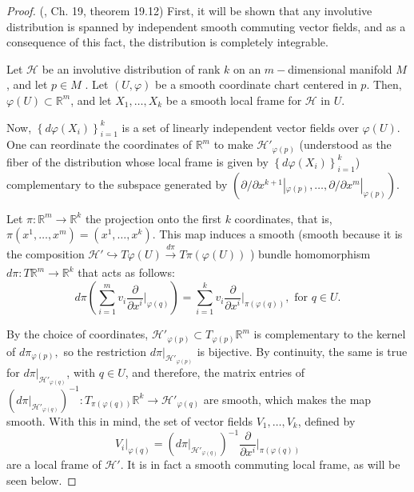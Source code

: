 \documentclass[12pt, letterpaper, reqno]{amsart}
\theoremstyle{definition}
\theoremstyle{plain}
\theoremstyle{remark}
\begin{document}
\begin{proof}
	(\cite{lee2003introduction}, Ch. 19, theorem 19.12) First, it will be shown that any involutive distribution is spanned by independent smooth commuting vector fields, and as a consequence of this fact, the distribution is completely integrable.

	Let $ \mathcal{H} $ be an involutive distribution of rank $ k $ on an $ m- $dimensional manifold $ M $, and let $ p\in M $ . Let $ (U,\varphi) $ be a smooth coordinate chart centered in $ p. $ Then, $ \varphi(U)\subset \mathbb{R}^m $, and let $ X_1,\dots,X_k $ be a smooth local frame for $ \mathcal{H} $ in $ U. $

	Now, $ \left\{ d\varphi \left( X_i \right) \right\}_{i=1}^k $ is a set of linearly independent vector fields over $ \varphi(U). $ One can reordinate the coordinates of $ \mathbb{R}^m $ to make $ \mathcal{H}'_{\varphi(p)} $ (understood as the fiber of the distribution whose local frame is given by $ \left\{ d\varphi \left( X_i \right) \right\}_{i=1}^k $) complementary to the subspace generated by $ \left( \partial/\partial x^{k+1}|_{\varphi(p)},\dots,\partial/\partial x^{m}|_{\varphi(p)} \right). $   

	Let $ \pi: \mathbb{R}^m \rightarrow  \mathbb{R}^k$ the projection onto the first $ k $ coordinates, that is, $ \pi(x^1,\dots,x^m)=(x^1,\dots,x^k). $ This map induces a smooth (smooth because it is the composition $\mathcal{H}' \hookrightarrow T\varphi(U) \xrightarrow[]{d\pi} T\pi(\varphi(U))$ )  bundle homomorphism $ d\pi: T \mathbb{R}^m \rightarrow \mathbb{R}^k	 $ that acts as follows:
	$$ d\pi \left( \sum_{i=1}^m v_i \frac{\partial}{\partial x^i} \Big|_{\varphi(q)}   \right) = \sum_{i=1}^k v_i \frac{\partial}{\partial x^i} \Big|_{\pi(\varphi(q))}, \text{ for }q\in U.$$ 

	By the choice of coordinates, $ \mathcal{H}'_{\varphi(p)}\subset T_{\varphi(p)} \mathbb{R}^m $ is complementary to the kernel of $ d\pi_{\varphi(p)}, $ so the restriction $ d\pi|_{\mathcal{H}'_{\varphi(p)}} $ is bijective. By continuity, the same is true for $ d\pi|_{\mathcal{H}'_{\varphi(q)}} $, with $ q\in U $, and therefore, the matrix entries of $ \left(d\pi|_{\mathcal{H}'_{\varphi(q)}} \right)^{-1}: T_{\pi(\varphi(q))} \mathbb{R}^k \rightarrow \mathcal{H}'_{\varphi(q)}$ are smooth, which makes the map smooth. With this in mind, the set of vector fields $ V_1,\dots,V_k $, defined by
	$$ V_i|_{\varphi(q)}= \left(  d\pi|_{\mathcal{H}'_{\varphi(q)}}  \right)^{-1} \frac{\partial}{\partial x^i} \Big|_{\pi(\varphi(q))} $$ 
	are a local frame of $ \mathcal{H'}. $ It is in fact a smooth commuting local frame, as will be seen below. 


\end{proof}
\end{document}
